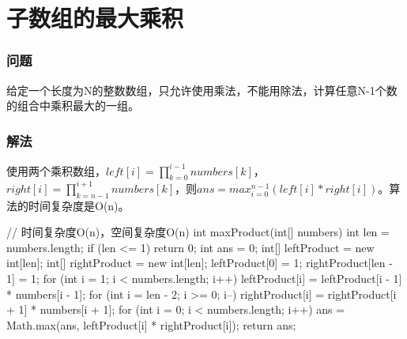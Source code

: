 \section{子数组的最大乘积} %
\label{sec:max-product}

\subsubsection{问题}
给定一个长度为N的整数数组，只允许使用乘法，不能用除法，计算任意N-1个数的组合中乘积最大的一组。

\subsubsection{解法}
使用两个乘积数组，$left[i]=\prod_{k=0}^{i-1}numbers[k]$，$right[i]=\prod_{k=n-1}^{i+1}numbers[k]$，则$ans = max_{i=0}^{n-1}(left[i]*right[i])$。算法的时间复杂度是O(n)。

\begin{Code}
// 时间复杂度O(n)，空间复杂度O(n)
int maxProduct(int[] numbers) {
    int len = numbers.length;
    if (len <= 1) {
        return 0;
    }
    int ans = 0;
    int[] leftProduct = new int[len];
    int[] rightProduct = new int[len];
    leftProduct[0] = 1;
    rightProduct[len - 1] = 1;
    for (int i = 1; i < numbers.length; i++) {
        leftProduct[i] = leftProduct[i - 1] * numbers[i - 1];
    }
    for (int i = len - 2; i >= 0; i--) {
        rightProduct[i] = rightProduct[i + 1] * numbers[i + 1];
    }
    for (int i = 0; i < numbers.length; i++) {
        ans = Math.max(ans, leftProduct[i] * rightProduct[i]);
    }
    return ans;
}
\end{Code}